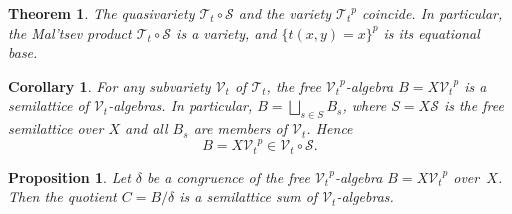 \documentclass[10pt,a4paper]{amsart}
\newtheorem{theorem}{Theorem}
\newtheorem{corollary}{Corollary}
\newtheorem{proposition}{Proposition}
\newcommand{\mcS}{\mathcal{S}}
\newcommand{\mcT}{\mathcal{T}}
\newcommand{\mcV}{\mathcal{V}}
\newcommand{\pro}[1]{{#1}^p}
\begin{document}
\begin{theorem}\label{T:varPt}
The quasivariety $\mcT_{t} \circ \mcS$ and the variety $\pro{\mcT_t}$ coincide.
In particular, the Mal'tsev product $\mcT_{t} \circ \mcS$ is a variety, and $\{t(x,y) = x\}^p$ is its equational base.
\end{theorem}

\begin{corollary}\label{C:freePVt}
  For any subvariety $\mcV_t$ of $\mcT_t$, the free $\pro{\mcV_t}$-algebra
  $B = X\pro{\mcV_t}$ is a semilattice of $\mcV_t$-algebras. In particular,
  $B = \bigsqcup_{s \in S} B_s $, where $S = X\mcS$ is the free semilattice over $X$ and
  all $B_s$ are members of $\mcV_t$. Hence
  \begin{equation*}
B = X\pro{\mcV_t} \in \mcV_t \circ \mcS.
\end{equation*}
\end{corollary}

\begin{proposition}\label{P:quotientC}
  Let $\delta$ be a congruence of the free $\pro{\mcV_{t}}$-algebra $B = X\pro{\mcV_t}$
  over~$X$. Then the quotient $C = B/\delta$ is a semilattice sum of $\mcV_t$-algebras.
\end{proposition}
\end{document}
